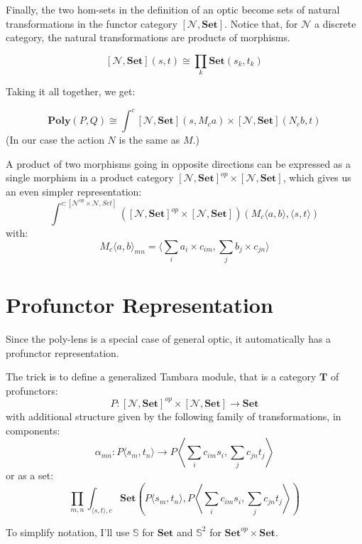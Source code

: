 \documentclass[11pt]{amsart}
\begin{document}
Finally, the two hom-sets in the definition of an optic become sets of natural transformations in the functor category $ [\mathcal{N}, \mathbf{Set}] $. Notice that, for $\mathcal{N}$ a discrete category, the natural transformations are products of morphisms.

\[ [\mathcal{N}, \mathbf{Set}] (s, t) \cong \prod_k  \mathbf{Set} \left(s_k, t_k\right) \]

Taking it all together, we get:

\[ \mathbf{Poly}(P, Q) \cong \int^{c}   [\mathcal{N}, \mathbf{Set}]  \left(s, M_c a\right)  \times  [\mathcal{N}, \mathbf{Set}]  \left(N_c b, t\right) \]
(In our case the action $N$ is the same as $M$.)

A product of two morphisms going in opposite directions can be expressed as a single morphism in a product category $[\mathcal{N}, \mathbf{Set}]^{op}\times [\mathcal{N}, \mathbf{Set}] $, which gives us an even simpler representation:
\[ \int^{c \colon [\mathcal{N}^{op} \times \mathcal{N}, Set]} ([\mathcal{N}, \mathbf{Set}]^{op}\times [\mathcal{N}, \mathbf{Set}]) \left(M_c\langle   a, b \rangle, \langle s, t \rangle \right)\]
with:
\[M_c \langle a, b\rangle_{m n} = \langle  \sum_i a_i \times  c_{ i m},  \sum_j  b_j \times c_{j n} \rangle \]
 
\section{Profunctor Representation}

Since the poly-lens is a special case of general optic, it automatically has a profunctor representation.

The trick is to define a generalized Tambara module, that is a category $\mathbf{T}$ of profunctors:
\[ P \colon [\mathcal{N}, \mathbf{Set}]^{op}  \times [\mathcal{N}, \mathbf{Set}] \to \mathbf{Set} \]
with additional structure given by the following family of transformations, in components:
\[\alpha_{m n} \colon P\langle s_m, t_n \rangle \to P \left \langle \sum_i c_{i m}  s_i, \sum_j c_{j n} t_j \right \rangle \]
or as a set:
\[ \prod_{m, n} \int_{ \langle s, t \rangle, c} \mathbf{Set} \left(P\langle s_m, t_n \rangle, P \left \langle \sum_i c_{i m}  s_i, \sum_j c_{j n} t_j \right \rangle \right) \]

To simplify notation, I'll use $\mathbb{S}$ for $\mathbf{Set}$ and $\mathbb{S}^2$ for $\mathbf{Set}^{op} \times \mathbf{Set}$.
\end{document}
